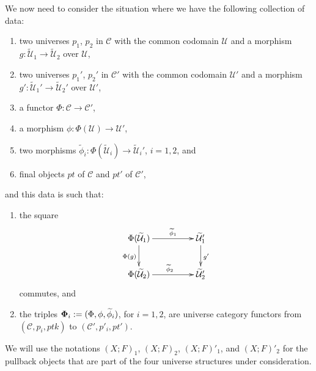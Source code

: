 \documentclass[12pt]{article}
\numberwithin{equation}{section}
\newenvironment{eq}{\begin{equation}}{\end{equation}}
\newcommand{\sr}{\rightarrow}
\newcommand{\wt}{\widetilde}
\newcommand{\C}{{\mathcal C}}  %
\newcommand{\U}{\mathcal{U}}
\begin{document}
We now need to consider the situation where we have the following collection of data:
%
\begin{enumerate}
\item two universes $p_1$, $p_2$ in $\C$ with the common codomain $\U$
  and a morphism $g:\wt{\U}_1\sr \wt{\U}_2$ over $\U$,
\item two universes $p_1'$, $p_2'$ in $\C'$ with the common codomain
  $\U'$ and a morphism $g':\wt{\U}_1'\sr \wt{\U}_2'$ over $\U'$,
\item a functor $\Phi:{\C}\sr {\C}'$,
\item a morphism $\phi:\Phi(\U)\sr \U'$,
\item two morphisms $\wt{\phi}_i:\Phi(\wt{\U}_i)\sr \wt{\U}_i'$, $i=1,2$, and
\item final objects $pt$ of $\C$ and $pt'$ of $\C'$,
\end{enumerate}
%
and this data is such that:
%
\begin{enumerate}
\item the square
%
\begin{eq}\label{two-univ-comm}
\begin{xy}
          \xymatrix@C=4pc{ \Phi(\wt{\U}_1) \ar[r]^-{\wt{\phi}_1}
            \ar[d]_{\Phi(g)} & \wt{\U}_1' \ar[d]^{g'}\\ \Phi(\wt{\U}_2)
            \ar[r]^{\wt{\phi}_2} & \wt{\U}_2' }
\end{xy}
\end{eq}
%
commutes, and
%
\item the triples ${\bf\Phi}_i:=(\Phi,\phi,\wt{\phi}_i)$, for $i=1,2$, are universe
  category functors from $(\C,p_i,ptk)$ to $(\C',p'_i,pt')$.
\end{enumerate}

We will use the notations $(X;F)_1$, $(X;F)_2$, $(X;F)'_1$, and $(X;F)'_2$ for
the pullback objects that are part of the four universe structures under
consideration. 
\end{document}
